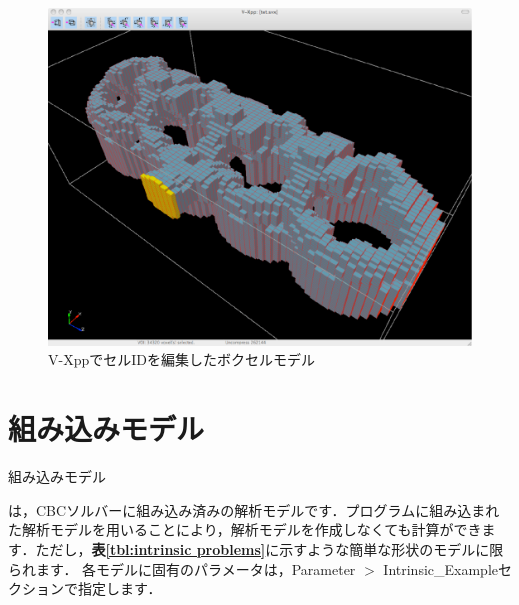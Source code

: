 \begin{enumerate}
\begin{figure}[htdp]
\begin{center}
\includegraphics[width=12cm,clip]{VXpp_coloredVoxel.eps}
\caption{V-XppでセルIDを編集したボクセルモデル}
\label{fig:editted voxel}
\end{center}
\end{figure}

\end{enumerate}

\pagebreak


\section{組み込みモデル}
\hypertarget{tgt:intrinsic model}{組み込みモデル}は，CBCソルバーに組み込み済みの解析モデルです．プログラムに組み込まれた解析モデルを用いることにより，解析モデルを作成しなくても計算ができます．ただし，\textbf{表\ref{tbl:intrinsic problems}}に示すような簡単な形状のモデルに限られます．
各モデルに固有のパラメータは，Parameter $>$ Intrinsic\_Exampleセクションで指定します．

